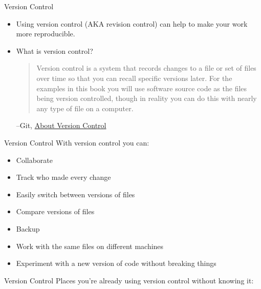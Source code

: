 \documentclass{beamer}
\begin{document}
\begin{frame}{Version Control}
\begin{itemize}
\item
Using version control (AKA revision control) can help to make your work more reproducible.

\item
What is version control?

\begin{quote}
Version control is a system that records changes to a file or set of files over time so that you can recall specific versions later. For the examples in this book you will use software source code as the files being version controlled, though in reality you can do this with nearly any type of file on a computer.
\end{quote}
--Git, \href{https://git-scm.com/book/en/v2/Getting-Started-About-Version-Control}{About Version Control}

\end{itemize}
\end{frame}
\begin{frame}{Version Control}
With version control you can:
\begin{itemize}
\item Collaborate 
\item Track who made every change
\item Easily switch between versions of files
\item Compare versions of files
\item Backup
\item Work with the same files on different machines
\item Experiment with a new version of code without breaking things
\end{itemize}
\href{http://stackoverflow.com/questions/1408450/why-should-i-use-version-control}{}
\href{http://tex.stackexchange.com/questions/1118/what-are-the-advantages-of-using-version-control-git-cvs-etc-in-latex-documen}{}
\href{http://stackoverflow.com/questions/1408450/why-should-i-use-version-control}{}
\end{frame}

\begin{frame}{Version Control}
Places you're already using version control without knowing it:
\end{frame}
\end{document}
